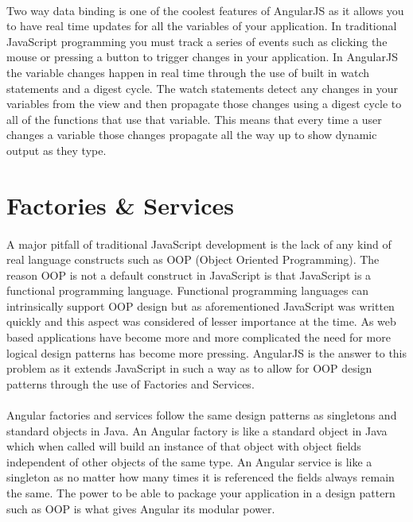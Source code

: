\documentclass[
10pt, %
a4paper, %
oneside, %
headinclude,footinclude, %
BCOR5mm, %
]{scrartcl}
\begin{document}
\paragraph{}
Two way data binding is one of the coolest features of AngularJS as it allows you to have real time updates for all the variables of your application.
In traditional JavaScript programming you must track a series of events such as clicking the mouse or pressing a button to trigger changes in your application.
In AngularJS the variable changes happen in real time through the use of built in watch statements and a digest cycle.
The watch statements detect any changes in your variables from the view and then propagate those changes using a digest cycle to all of the functions that use that variable.\cite{angularbook}
This means that every time a user changes a variable those changes propagate all the way up to show dynamic output as they type.

\section{Factories \& Services}
\paragraph{}
A major pitfall of traditional JavaScript development is the lack of any kind of real language constructs such as OOP (Object Oriented Programming).
The reason OOP is not a default construct in JavaScript is that JavaScript is a functional programming language.
Functional programming languages can intrinsically support OOP design but as aforementioned JavaScript was written quickly and this aspect was considered of lesser importance at the time.
As web based applications have become more and more complicated the need for more logical design patterns has become more pressing.
AngularJS is the answer to this problem as it extends JavaScript in such a way as to allow for OOP design patterns through the use of Factories and Services.

\paragraph{}
Angular factories and services follow the same design patterns as singletons and standard objects in Java.
An Angular factory is like a standard object in Java which when called will build an instance of that object with object fields independent of other objects of the same type.
An Angular service is like a singleton as no matter how many times it is referenced the fields always remain the same.
The power to be able to package your application in a design pattern such as OOP is what gives Angular its modular power.
\end{document}
